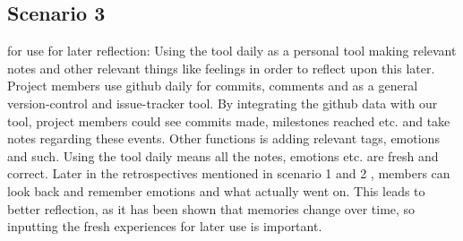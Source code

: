 \subsection{Scenario 3}
\label{scenario1}
for use for later reflection: Using the tool daily as a personal tool making relevant notes and other relevant things like feelings in order to reflect upon this later. Project members use github daily for commits, comments and as a general version-control and issue-tracker tool. By integrating the github data with our tool, project members could see commits made, milestones reached etc. and take notes regarding these events. Other functions is adding relevant tags, emotions and such. Using the tool daily means all the notes, emotions etc. are fresh and correct. Later in the retrospectives mentioned in scenario 1 and 2 , members can look back and remember emotions and what actually went on. This leads to better reflection, as it has been shown that memories change over time, so inputting the fresh experiences for later use is important. 
